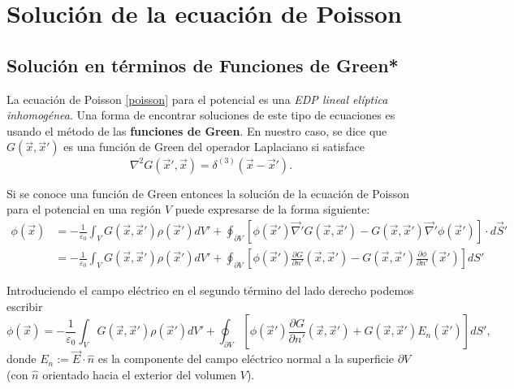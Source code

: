 

 \section{Solución de la ecuación de Poisson} 
 \subsection{Solución en términos de Funciones de Green*}\label{Green}
 La ecuación de Poisson \eqref{poisson} para el potencial es una \textit{EDP lineal elíptica inhomogénea}. Una forma de encontrar soluciones de este tipo de ecuaciones es usando el método de las \textbf{funciones de Green}. En nuestro caso, se dice que $G(\vec{x},\vec{x}')$ es una función de Green del operador Laplaciano si satisface
\begin{equation}\label{EDPG}
\nabla^2G(\vec{x}',\vec{x})=\delta^{(3)}(\vec{x}-\vec{x}').
\end{equation} 

Si se conoce una función de Green entonces la solución de la ecuación de Poisson para el potencial en una región $V$ puede expresarse de la forma siguiente:
\begin{align}
\phi(\vec{x}) &= -\frac{1}{\varepsilon_0}\int_VG(\vec{x},\vec{x}')\rho(\vec{x}')dV'+\oint_{\partial V}\left[\phi(\vec{x}')\vec\nabla' G(\vec{x},\vec{x}')-G(\vec{x},\vec{x}')\vec\nabla'\phi(\vec{x}')\right]\cdot d\vec{S}' \\
&=  -\frac{1}{\varepsilon_0}\int_VG(\vec{x},\vec{x}') \rho(\vec{x}')dV'+\oint_{\partial V}\left[\phi(\vec{x}')\frac{\partial G}{\partial n'}(\vec{x},\vec{x}')-G(\vec{x},\vec{x}')\frac{\partial\phi}{\partial n'}(\vec{x}')\right]dS'
\end{align}

Introduciendo el campo eléctrico en el segundo término del lado derecho podemos escribir
\begin{equation}\label{solPoisson}
\phi(\vec{x})= -\frac{1}{\varepsilon_0}\int_VG(\vec{x},\vec{x}') \rho(\vec{x}')dV'+\oint_{\partial V}\left[\phi(\vec{x}')\frac{\partial G}{\partial n'}(\vec{x},\vec{x}')+G(\vec{x},\vec{x}')E_n(\vec{x}')\right]dS',
\end{equation}
donde $E_n:=\vec{E}\cdot\hat{n}$ es la componente del campo eléctrico normal a la superficie $\partial V$ (con $\hat{n}$ orientado hacia el exterior del volumen $V$).

